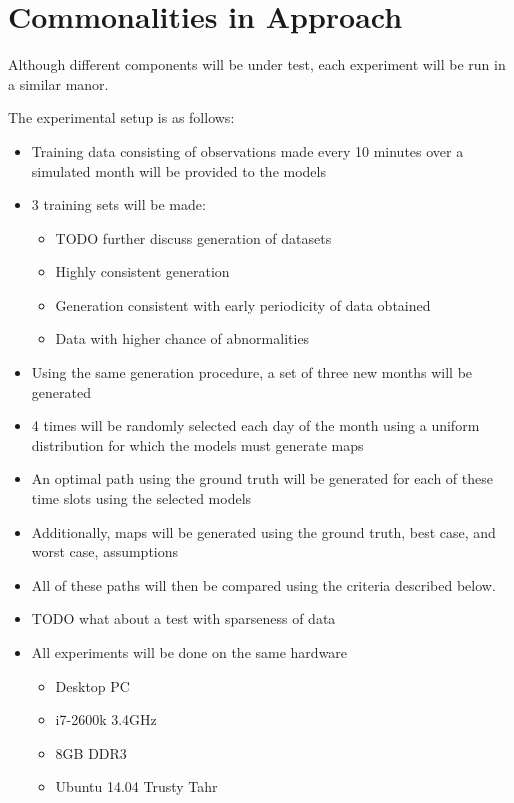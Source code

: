 \section{ Commonalities in Approach }
Although different components will be under test, each experiment will be run
in a similar manor.

The experimental setup is as follows:

\begin{itemize}

  \item Training data consisting of observations made every 10 minutes over a simulated month will
        be provided to the models

  \item 3 training sets will be made:
    \begin{itemize}

      \item TODO further discuss generation of datasets

      \item Highly consistent generation

      \item Generation consistent with early periodicity of data obtained

      \item Data with higher chance of abnormalities

    \end{itemize}

  \item Using the same generation procedure, a set of three new months will be
        generated

  \item 4 times will be randomly selected each day of the month using a
        uniform distribution for which the models must generate maps

  \item An optimal path using the ground truth will be generated for each of
        these time slots using the selected models

  \item Additionally, maps will be generated using the ground truth, best
        case, and worst case, assumptions

  \item All of these paths will then be compared using the criteria described
        below.

  \item TODO what about a test with sparseness of data

  \item All experiments will be done on the same hardware
    \begin{itemize}
      \item Desktop PC
      \item i7-2600k 3.4GHz
      \item 8GB DDR3
      \item Ubuntu 14.04 Trusty Tahr
    \end{itemize}

\end{itemize}


